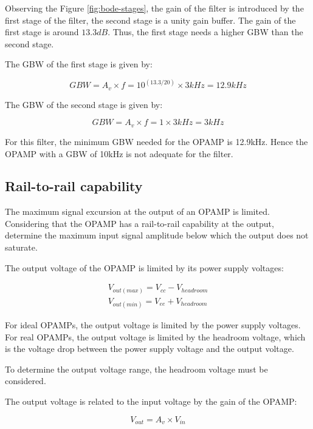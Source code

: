 Observing the Figure \ref{fig:bode-stages}, the gain of the filter is introduced by the first stage of the filter, the second stage is a unity gain buffer. The gain of the first stage is around $13.3dB$. Thus, the first stage needs a higher GBW than the second stage. 

The GBW of the first stage is given by:

\begin{equation}
    GBW = A_v \times f = 10^{(13.3/20)} \times 3kHz = 12.9kHz
\end{equation}

The GBW of the second stage is given by:

\begin{equation}
    GBW = A_v \times f = 1 \times 3kHz = 3kHz
\end{equation}

For this filter, the minimum GBW needed for the OPAMP is 12.9kHz. Hence the OPAMP with a GBW of 10kHz is not adequate for the filter.

\subsection{Rail-to-rail capability}
The maximum signal excursion at the output of an OPAMP is limited. Considering that the
OPAMP has a rail-to-rail capability at the output, determine the maximum input signal
amplitude below which the output does not saturate.

The output voltage of the OPAMP is limited by its power supply voltages:

\begin{equation}
    \begin{aligned}
        V_{out(max)} = V_{cc} - V_{headroom} \\
        V_{out(min)} = V_{ee} + V_{headroom}
    \end{aligned}
\end{equation}

For ideal OPAMPs, the output voltage is limited by the power supply voltages. For real OPAMPs, the output voltage is limited by the headroom voltage, which is the voltage drop between the power supply voltage and the output voltage. 

To determine the output voltage range, the headroom voltage must be considered. 

The output voltage is related to the input voltage by the gain of the OPAMP:

\begin{equation}
    V_{out} = A_v \times V_{in}
\end{equation}

